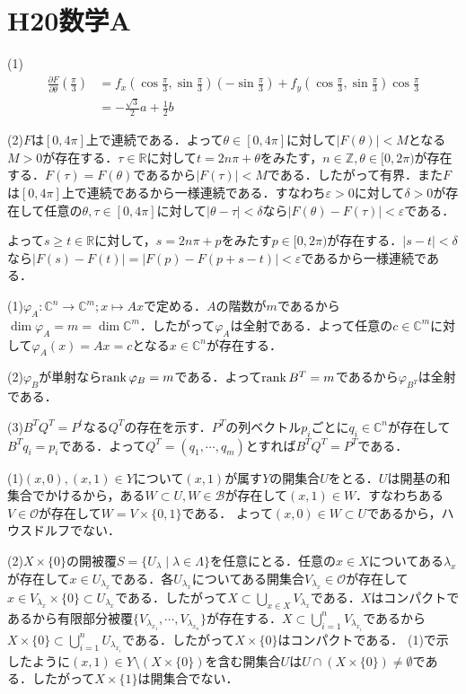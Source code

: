 \documentclass[
		book,
		head_space=20mm,
		foot_space=20mm,
		gutter=10mm,
		line_length=190mm
]{jlreq}
\begin{document}
\section{H20数学A}
(1)\begin{align}
	\frac{\partial F}{\partial\theta}\left( \frac{\pi}{3} \right)&=
	f_x(\cos \frac{\pi}{3},\sin \frac{\pi}{3})(-\sin \frac{\pi}{3})+f_y(\cos \frac{\pi}{3},\sin \frac{\pi}{3})\cos \frac{\pi}{3}\\
	&=-\frac{\sqrt{3}}{2}a+\frac{1}{2}b
\end{align}

(2)$F$は$[0,4\pi]$上で連続である．よって$\theta\in [0,4\pi]$に対して$|F(\theta)|<M$となる$M>0$が存在する．$\tau\in \mathbb{R}$に対して$t=2n\pi+\theta$をみたす，$n\in \mathbb{Z},\theta\in [0,2\pi)$が存在する．$F(\tau)=F(\theta)$であるから$|F(\tau)|<M$である．したがって有界．また$F$は$[0,4\pi]$上で連続であるから一様連続である．すなわち$\varepsilon>0$に対して$\delta>0$が存在して任意の$\theta,\tau\in [0,4\pi]$に対して$|\theta-\tau|<\delta$なら$|F(\theta)-F(\tau)|<\varepsilon$である．

よって$s\ge t \in \mathbb{R}$に対して，$s=2n\pi+p$をみたす$p\in[0,2\pi)$が存在する．$|s-t|<\delta$なら$|F(s)-F(t)|=|F(p)-F(p+s-t)|<\varepsilon$であるから一様連続である．

(1)$\varphi_A \colon \mathbb{C}^n \rightarrow \mathbb{C}^m;x\mapsto Ax$で定める．$A$の階数が$m$であるから$\dim \varphi_A=m=\dim \mathbb{C}^m$．したがって$\varphi_A$は全射である．よって任意の$c\in \mathbb{C}^m$に対して$\varphi_A(x)=Ax=c$となる$x \in \mathbb{C}^n$が存在する．

(2)$\varphi_B$が単射なら$\rank \varphi_B=m$である．よって$\rank B^T=m$であるから$\varphi_{B^T}$は全射である．

(3)$B^TQ^T=P^t$なる$Q^T$の存在を示す．$P^T$の列ベクトル$p_i$ごとに$q_i \in \mathbb{C}^n$が存在して$B^Tq_i=p_i$である．よって$Q^T=(q_1,\cdots,q_m)$とすれば$B^TQ^T=P^T$である．

(1)$(x,0),(x,1)\in Y $について$(x,1)$が属す$Y$の開集合$U$をとる．$U$は開基の和集合でかけるから，ある$W\subset U,W \in \mathcal{B}$が存在して$(x,1)\in W$．すなわちある$V \in \mathcal{O}$が存在して$W=V\times \{0,1\}$である．
よって$(x,0)\in W\subset U$であるから，ハウスドルフでない．

(2)$X\times \{ 0\}$の開被覆$S=\{ U_\lambda\mid \lambda\in \Lambda\}$を任意にとる．任意の$x\in X$についてある$\lambda_x$が存在して$x \in U_{\lambda_x}$である．各$U_{\lambda_x}$についてある開集合$V_{\lambda_x}\in \mathcal{O}$が存在して
$x \in V_{\lambda_x}\times \{ 0\} \subset U_{\lambda_x}$である．したがって$X \subset \bigcup\limits_{x\in X}V_{\lambda_x}$である．$X$はコンパクトであるから有限部分被覆$\{ V_{\lambda_{x_1}},\cdots,V_{\lambda_{x_n}}\}$が存在する．$X \subset \bigcup\limits_{i=1}^nV_{\lambda_{x_i}}$であるから$X\times \{ 0\} \subset \bigcup\limits_{i=1}^nU_{\lambda_{x_i}}$である．したがって$X\times \{ 0\}$はコンパクトである．
(1)で示したように$(x,1)\in Y\setminus (X\times\{0\} )$を含む開集合$U$は$U\cap (X \times \{0\})\neq \emptyset$である．したがって$X\times\{ 1\}$は開集合でない．
\end{document}
